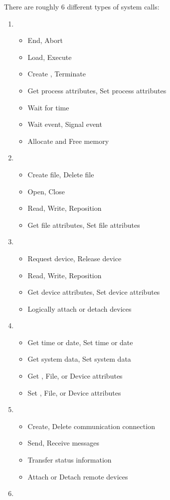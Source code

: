 There are roughly 6 different types of system calls:
\begin{enumerate}[noitemsep]
\item {}
  \begin{itemize}[noitemsep]
  \item End, Abort
  \item Load, Execute
  \item Create , Terminate 
  \item Get process attributes, Set process attributes
  \item Wait for time
  \item Wait event, Signal event
  \item Allocate and Free memory
  \end{itemize}
\item {}
  \begin{itemize}[noitemsep]
  \item Create file, Delete file
  \item Open, Close
  \item Read, Write, Reposition
  \item Get file attributes, Set file attributes
  \end{itemize}
\item {}
  \begin{itemize}[noitemsep]
  \item Request device, Release device
  \item Read, Write, Reposition
  \item Get device attributes, Set device attributes
  \item Logically attach or detach devices
  \end{itemize}
\item {}
  \begin{itemize}[noitemsep]
  \item Get time or date, Set time or date
  \item Get system data, Set system data
  \item Get , File, or Device attributes
  \item Set , File, or Device attributes
  \end{itemize}
\item {}
  \begin{itemize}[noitemsep]
  \item Create, Delete communication connection
  \item Send, Receive messages
  \item Transfer status information
  \item Attach or Detach remote devices
  \end{itemize}
\item {}
\end{enumerate}

